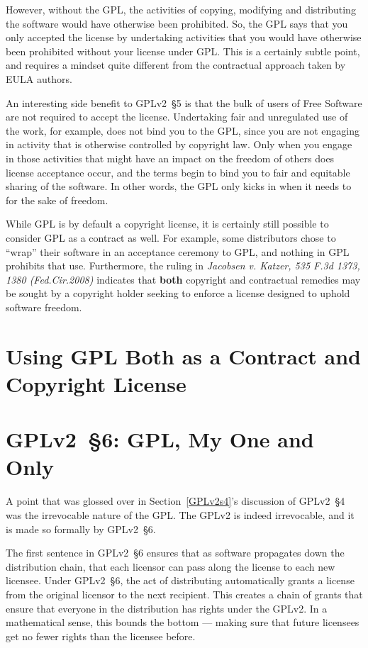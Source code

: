 However, without the GPL, the activities of copying, modifying and
distributing the software would have otherwise been prohibited.  So, the
GPL says that you only accepted the license by undertaking activities that
you would have otherwise been prohibited without your license under GPL\@.
This is a certainly subtle point, and requires a mindset quite different
from the contractual approach taken by EULA authors.

An interesting side benefit to GPLv2~\S5 is that the bulk of users of Free
Software are not required to accept the license.  Undertaking fair and
unregulated use of the work, for example, does not bind you to the GPL,
since you are not engaging in activity that is otherwise controlled by
copyright law.  Only when you engage in those activities that might have an
impact on the freedom of others does license acceptance occur, and the
terms begin to bind you to fair and equitable sharing of the software.  In
other words, the GPL only kicks in when it needs to for the sake of
freedom.

While GPL is by default a copyright license, it is certainly still possible
to consider GPL as a contract as well.  For example, some distributors chose
to ``wrap'' their software in an acceptance ceremony to GPL, and nothing in
GPL prohibits that use.  Furthermore, the ruling in \textit{Jacobsen
  v. Katzer, 535 F.3d 1373, 1380 (Fed.Cir.2008)} indicates that \textbf{both}
copyright and contractual remedies may be sought by a copyright holder
seeking to enforce a license designed to uphold software freedom.

\section{Using GPL Both as a Contract and Copyright License}

\section{GPLv2~\S6: GPL, My One and Only}
\label{GPLv2s6}

A point that was glossed over in Section~\ref{GPLv2s4}'s discussion of GPLv2~\S4
was the irrevocable nature of the GPL\@. The GPLv2 is indeed irrevocable,
and it is made so formally by GPLv2~\S6.

The first sentence in GPLv2~\S6 ensures that as software propagates down the
distribution chain, that each licensor can pass along the license to each
new licensee.  Under GPLv2~\S6, the act of distributing automatically grants a
license from the original licensor to the next recipient.  This creates a
chain of grants that ensure that everyone in the distribution has rights
under the GPLv2\@.  In a mathematical sense, this bounds the bottom ---
making sure that future licensees get no fewer rights than the licensee before.

